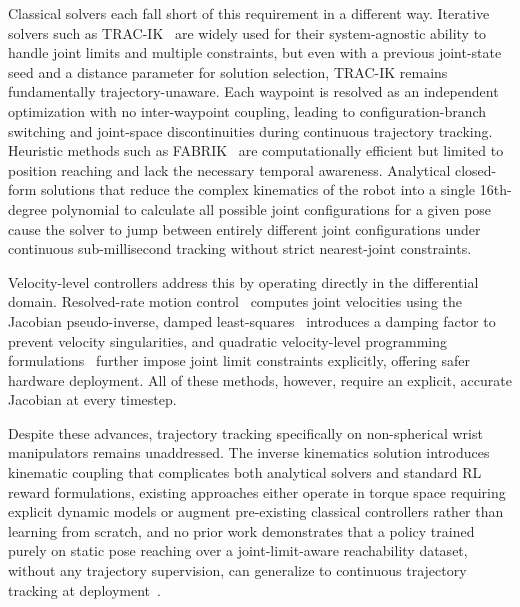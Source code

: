 Classical solvers each fall short of this requirement in a different way. Iterative solvers such as
TRAC-IK~\citep{beeson2015trac} are widely used for their system-agnostic ability to handle joint
limits and multiple constraints, but even with a previous joint-state seed and a distance parameter
for solution selection, TRAC-IK remains fundamentally trajectory-unaware. Each waypoint is resolved
as an independent optimization with no inter-waypoint coupling, leading to configuration-branch
switching and joint-space discontinuities during continuous trajectory tracking. Heuristic methods
such as FABRIK~\citep{aristidou2011fabrik} are computationally efficient but limited to position
reaching and lack the necessary temporal awareness. Analytical closed-form solutions that reduce the
complex kinematics of the robot into a single 16th-degree polynomial to calculate all possible joint
configurations for a given pose~\citep{zohour2021kinova} cause the solver to jump between entirely
different joint configurations under continuous sub-millisecond tracking without strict nearest-joint
constraints.

Velocity-level controllers address this by operating directly in the differential domain.
Resolved-rate motion control~\citep{whitney1969resolved} computes joint velocities using the
Jacobian pseudo-inverse, damped least-squares~\citep{wampler1986manipulator,chiaverini1994review}
introduces a damping factor to prevent velocity singularities, and quadratic velocity-level
programming formulations~\citep{zhang2013variable} further impose joint limit constraints explicitly,
offering safer hardware deployment. All of these methods, however, require an explicit, accurate
Jacobian at every timestep.

Despite these advances, trajectory tracking specifically on non-spherical wrist manipulators remains
unaddressed. The inverse kinematics solution introduces kinematic coupling that complicates both
analytical solvers and standard RL reward formulations, existing approaches either operate in torque
space requiring explicit dynamic models or augment pre-existing classical controllers rather than
learning from scratch, and no prior work demonstrates that a policy trained purely on static pose
reaching over a joint-limit-aware reachability dataset, without any trajectory supervision, can
generalize to continuous trajectory tracking at deployment~\citep{sk2025diktracking}.

